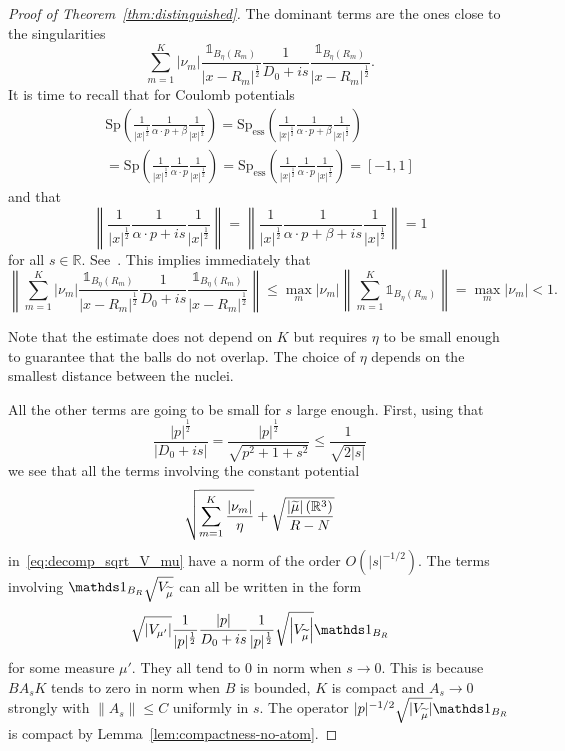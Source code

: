 \documentclass[10pt]{amsart}
\theoremstyle{definition}
\newcommand{\R}{\mathbb{R}}
\newcommand{\Spec}{\mathrm{Sp}}
\DeclareMathOperator{\ess}{ess}
\newcommand\1{{\ensuremath {\mathds 1} }}
\newcommand{\norm}[1]{ \left\| #1 \right\|}
\renewcommand{\leq}{\leqslant}
\renewcommand{\tilde}{\widetilde}
\let\oldtilde\tilde
\renewcommand*{\tilde}[1]{\mathchoice{\widetilde{#1}}{\widetilde{#1}}{\oldtilde{#1}}{\oldtilde{#1}}}
\begin{document}
\begin{proof}[Proof of Theorem~\ref{thm:distinguished}]
The dominant terms are the ones close to the singularities
\[
\sum_{m=1}^K\left|\nu_m\right|\frac{\1_{B_\eta(R_m)}}{\left|x-R_m\right|^{\frac12}}\frac{1}{D_0+is}\frac{\1_{B_\eta(R_m)}}{\left|x-R_m\right|^{\frac12}}.
\]
It is time to recall that for Coulomb potentials
\begin{multline}\label{eq:rappel_Coulomb}
\Spec\left(\frac{1}{|x|^{\frac12}}\frac{1}{\alpha\cdot p+\beta}\frac{1}{|x|^{\frac12}}\right)=\Spec_{\ess}\left(\frac{1}{|x|^{\frac12}}\frac{1}{\alpha\cdot p+\beta}\frac{1}{|x|^{\frac12}}\right)\\=\Spec\left(\frac{1}{|x|^{\frac12}}\frac{1}{\alpha\cdot p}\frac{1}{|x|^{\frac12}}\right)=\Spec_{\ess}\left(\frac{1}{|x|^{\frac12}}\frac{1}{\alpha\cdot p}\frac{1}{|x|^{\frac12}}\right)=[-1,1]
\end{multline}
and that
\begin{equation}\label{eq:rappel_Coulomb_2}
\norm{\frac{1}{|x|^{\frac12}}\frac{1}{\alpha\cdot p+is}\frac{1}{|x|^{\frac12}}}=\norm{\frac{1}{|x|^{\frac12}}\frac{1}{\alpha\cdot p+\beta+is}\frac{1}{|x|^{\frac12}}}=1
\end{equation}
for all $s\in\R$. See~\cite{ArrDuoVeg-13,Kato-83,Klaus-80b,Nenciu-76,Wust-77}. This implies immediately that
\[
\norm{\sum_{m=1}^K\left|\nu_m\right|\frac{\1_{B_\eta(R_m)}}{\left|x-R_m\right|^{\frac12}}\frac{1}{D_0+is}\frac{\1_{B_\eta(R_m)}}{\left|x-R_m\right|^{\frac12}}}
\leq\max_m\left|\nu_m\right|\norm{\sum_{m=1}^K\1_{B_\eta(R_m)}}=\max_m\left|\nu_m\right|<1.
\]

Note that the estimate does not depend on $K$ but requires $\eta$ to be small enough to guarantee that the balls do not overlap. The choice of $\eta$ depends on the smallest distance between the nuclei.

All the other terms are going to be small for $s$ large enough. First, using that
\[
\frac{|p|^{\frac12}}{\left|D_0+is\right|}=\frac{|p|^{\frac12}}{\sqrt{p^2+1+s^2}}\leq\frac{1}{\sqrt{2|s|}}
\]
we see that all the terms involving the constant potential
\[
\sqrt{\sum_{m=1}^K\frac{\left|\nu_m\right|}{\eta}}+\sqrt{\frac{\left|\tilde\mu\right|\left(\R^3\right)}{R-N}}
\]
in~\eqref{eq:decomp_sqrt_V_mu} have a norm of the order $O(|s|^{-1/2})$. The terms involving $\1_{B_R}\sqrt{V_{\tilde\mu}}$ can all be written in the form
\[
\sqrt{\left|V_{\mu'}\right|}\frac1{|p|^{\frac12}}\frac{|p|}{D_0+is}\frac1{|p|^{\frac12}}\sqrt{\left|V_{\tilde\mu}\right|}\1_{B_R}
\]
for some measure $\mu'$. They all tend to 0 in norm when $s\to0$. This is because $BA_sK$ tends to zero in norm when $B$ is bounded, $K$ is compact and $A_s\to0$ strongly with $\|A_s\|\leq C$ uniformly in $s$. The operator $|p|^{-1/2}\sqrt{|V_{\tilde\mu}|}\1_{B_R}$ is compact by Lemma~\ref{lem:compactness-no-atom}.


\end{proof}
\end{document}
